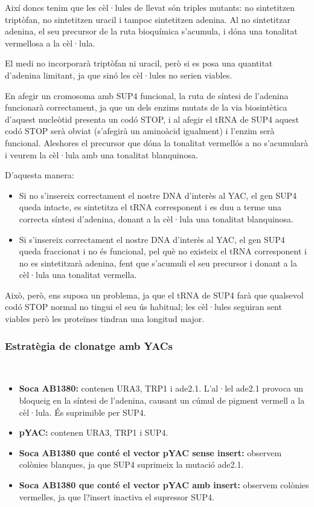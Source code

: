 Així doncs tenim que les cèl·lules de llevat són triples mutants: no sintetitzen triptòfan, no sintetitzen uracil i tampoc sintetitzen adenina. Al no sintetitzar adenina, el seu precursor de la ruta bioquímica s'acumula, i dóna una tonalitat vermellosa a la cèl·lula.

El medi no incorporarà triptòfan ni uracil, però si es posa una quantitat d'adenina limitant, ja que sinó les cèl·lules no serien viables.

En afegir un cromosoma amb SUP4 funcional, la ruta de síntesi de l'adenina funcionarà correctament, ja que un dels enzims mutats de la via biosintètica d'aquest nucleòtid presenta un codó STOP, i al afegir el tRNA de SUP4 aquest codó STOP serà obviat (s'afegirà un aminoàcid igualment) i l'enzim serà funcional. Aleshores el precursor que dóna la tonalitat vermellós a no s'acumularà i veurem la cèl·lula amb una tonalitat blanquinosa.

D'aquesta manera:
\begin{itemize}
\item Si no s'insereix correctament el nostre DNA d'interès al YAC, el gen SUP4 queda intacte, es sintetitza el tRNA corresponent i es duu a terme una correcta síntesi d'adenina, donant a la cèl·lula una tonalitat blanquinosa.

\item Si s'insereix correctament el nostre DNA d'interès al YAC, el gen SUP4 queda fraccionat i no és funcional, pel què no existeix el tRNA corresponent i no es sintetitzarà adenina, fent que s'acumuli el seu precursor i donant a la cèl·lula una tonalitat vermella.
\end{itemize}

Això, però, ens suposa un problema, ja que el tRNA de SUP4 farà que qualsevol codó STOP normal no tingui el seu ús habitual; les cèl·lules seguiran sent viables però les proteïnes tindran una longitud major.

\subsubsection{Estratègia de clonatge amb YACs} \hfill \\
\begin{itemize}
\item \textbf{Soca AB1380:} contenen URA3, TRP1 i ade2.1. L'al·lel ade2.1 provoca un bloqueig en la síntesi de l'adenina, causant un cúmul de pigment vermell a la cèl·lula. És suprimible per SUP4.
\item \textbf{pYAC:} contenen URA3, TRP1 i SUP4.
\item \textbf{Soca AB1380 que conté el vector pYAC sense insert:} observem colònies blanques, ja que SUP4 suprimeix la mutació ade2.1.
\item \textbf{Soca AB1380 que conté el vector pYAC amb insert:} observem colònies vermelles, ja que l?insert inactiva el supressor SUP4.
\end{itemize}

